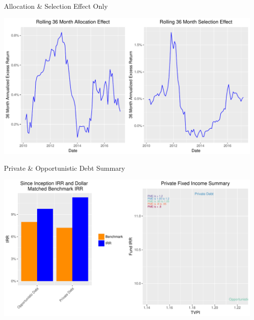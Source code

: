 \documentclass[10pt,english]{beamer}\usepackage[]{graphicx}\usepackage[]{color}
\makeatletter
\def\maxwidth{ %
  \ifdim\Gin@nat@width>\linewidth
    \linewidth
  \else
    \Gin@nat@width
  \fi
}
\newenvironment{knitrout}{}{} %
\makeatother
\begin{document}
\begin{frame}[fragile]{Allocation \& Selection Effect Only}

\begin{knitrout}
\color{fgcolor}
\includegraphics[width=\maxwidth]{figure/fi_rolling-1} 

\end{knitrout}
\end{frame}
%
\begin{frame}[fragile]{Private \& Opportunistic Debt Summary}

\begin{knitrout}
\color{fgcolor}
\includegraphics[width=\maxwidth]{figure/fi_privates-1} 

\end{knitrout}
\end{frame}
%
\end{document}
